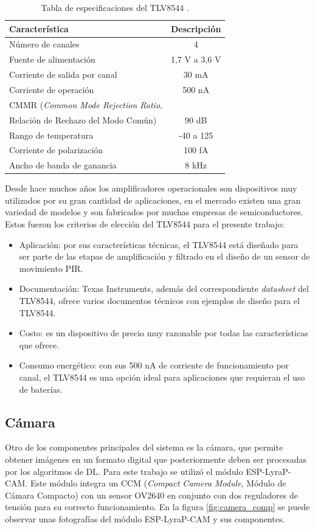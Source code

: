 \begin{table}[h]
	\centering
	\caption[TLV8544 especificaciones]{Tabla de especificaciones del TLV8544 \cite{opamp_info}.}
	\begin{tabular}{lc}   
		\toprule
		\textbf{Característica} 	 & \textbf{Descripción}  \\
		\midrule
		Número de canales & 4 \\
		Fuente de alimentación & 1,7 V a 3,6 V \\
		Corriente de salida por canal & 30 mA \\
		Corriente de operación & 500 nA \\
		CMMR (\textit{Common Mode Rejection Ratio}, \\ Relación de Rechazo del Modo Común) & 90 dB \\
		Rango de temperatura & -40 \textcelsius  a 125 \textcelsius\\
		Corriente de polarización & 100 fA \\
		Ancho de banda de ganancia & 8 kHz \\
		\bottomrule
		\hline
	\end{tabular}
	\label{tab:opamp_specs}
\end{table}

Desde hace muchos años los amplificadores operacionales son dispositivos muy utilizados por su gran cantidad de aplicaciones, en el mercado existen una gran variedad de modelos y son fabricados por muchas empresas de semiconductores. Estos fueron los criterios de elección del TLV8544 para el presente trabajo:
\begin{itemize}
	\item Aplicación: por sus características técnicas, el TLV8544 está diseñado para ser parte de las etapas de amplificación y filtrado en el diseño de un sensor de movimiento PIR.
	\item Documentación: Texas Instruments, además del correspondiente \textit{datasheet} del TLV8544, ofrece varios documentos técnicos con ejemplos de diseño para el TLV8544.
	\item Costo: es un dispositivo de precio muy razonable por todas las características que ofrece.
	\item Consumo energético: con sus 500 nA de corriente de funcionamiento por canal, el TLV8544 es una opción ideal para aplicaciones que requieran el uso de baterías.
\end{itemize}

\subsection{Cámara}
Otro de los componentes principales del sistema es la cámara, que permite obtener imágenes en un formato digital que posteriormente deben ser procesadas por los algoritmos de DL. Para este trabajo se utilizó el módulo ESP-LyraP-CAM. Este módulo integra un CCM (\textit{Compact Camera Module}, Módulo de Cámara Compacto) con un sensor OV2640 en conjunto con dos reguladores de tensión para su correcto funcionamiento. En la figura \ref{fig:camera_comp} se puede observar unas fotografías del módulo ESP-LyraP-CAM y sus componentes.

